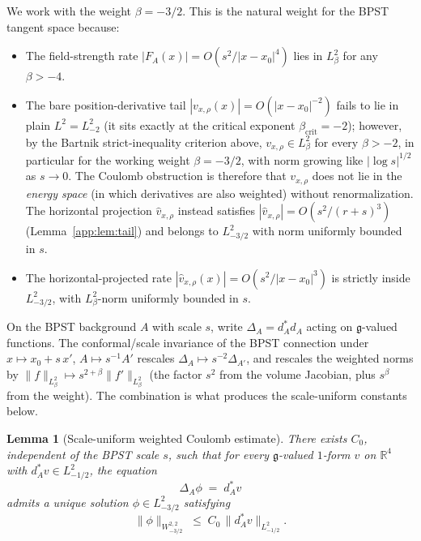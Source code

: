 \documentclass[11pt,letterpaper]{article}
\newtheorem{lemma}[theorem]{Lemma}
\theoremstyle{definition}
\newcommand{\bbR}{\mathbb{R}}
\newcommand{\fg}{\mathfrak{g}}
\newcommand{\Lap}{\Delta}
\begin{document}
We work with the weight $\beta = -3/2$. This is the natural weight for the BPST tangent space because:
\begin{itemize}\setlength{\itemsep}{2pt}
\item The field-strength rate $|F_A(x)| = O(s^2/|x-x_0|^4)$ lies in $L^2_\beta$ for any $\beta > -4$.
\item The bare position-derivative tail $|v_{x,\rho}(x)| = O(|x-x_0|^{-2})$ fails to lie in plain $L^2 = L^2_{-2}$ (it sits exactly at the critical exponent $\beta_\mathrm{crit} = -2$); however, by the Bartnik strict-inequality criterion above, $v_{x,\rho} \in L^2_\beta$ for every $\beta > -2$, in particular for the working weight $\beta = -3/2$, with norm growing like $|\log s|^{1/2}$ as $s \to 0$. The Coulomb obstruction is therefore that $v_{x,\rho}$ does not lie in the \emph{energy space} (in which derivatives are also weighted) without renormalization. The horizontal projection $\hat v_{x,\rho}$ instead satisfies $|\hat v_{x,\rho}| = O(s^2/(r+s)^3)$ (Lemma~\ref{app:lem:tail}) and belongs to $L^2_{-3/2}$ with norm uniformly bounded in $s$.
\item The horizontal-projected rate $|\hat v_{x,\rho}(x)| = O(s^2/|x-x_0|^3)$ is strictly inside $L^2_{-3/2}$, with $L^2_\beta$-norm uniformly bounded in $s$.
\end{itemize}

On the BPST background $A$ with scale $s$, write $\Lap_A = d_A^* d_A$ acting on $\fg$-valued functions. The conformal/scale invariance of the BPST connection under $x \mapsto x_0 + s\, x'$, $A \mapsto s^{-1} A'$ rescales $\Lap_A \mapsto s^{-2}\Lap_{A'}$, and rescales the weighted norms by $\|f\|_{L^2_\beta} \mapsto s^{2+\beta}\|f'\|_{L^2_\beta}$ (the factor $s^{2}$ from the volume Jacobian, plus $s^\beta$ from the weight). The combination is what produces the scale-uniform constants below.

\begin{lemma}[Scale-uniform weighted Coulomb estimate]\label{app:lem:coulomb}
There exists $C_0$, independent of the BPST scale $s$, such that for every $\fg$-valued $1$-form $v$ on $\bbR^4$ with $d_A^* v \in L^2_{-1/2}$, the equation
\[
\Lap_A \phi \;=\; d_A^* v
\]
admits a unique solution $\phi \in L^2_{-3/2}$ satisfying
\[
\|\phi\|_{W^{2,2}_{-3/2}} \;\le\; C_0\,\|d_A^* v\|_{L^2_{-1/2}}.
\]
\end{lemma}
\end{document}

